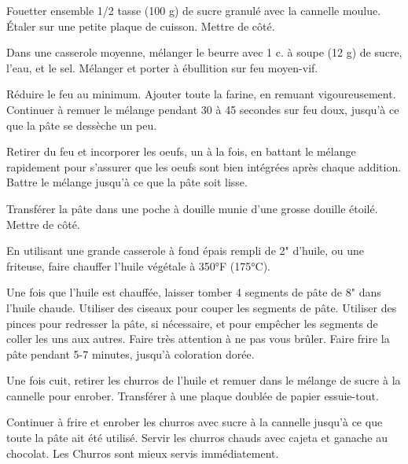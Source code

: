 \begin{steps}
    \item[] 
    \item Fouetter ensemble 1/2 tasse (100 g) de sucre granulé avec la cannelle moulue. Étaler sur une petite plaque de cuisson. Mettre de côté.
    \item Dans une casserole moyenne, mélanger le beurre avec 1 c. à soupe (12 g) de sucre, l'eau, et le sel. Mélanger et porter à ébullition sur feu moyen-vif.
    \item Réduire le feu au minimum. Ajouter toute la farine, en remuant vigoureusement. Continuer à remuer le mélange pendant 30 à 45 secondes sur feu doux, jusqu'à ce que la pâte se dessèche un peu.
    \item Retirer du feu et incorporer les oeufs, un à la fois, en battant le mélange rapidement pour s'assurer que les oeufs sont bien intégrées après chaque addition. Battre le mélange jusqu'à ce que la pâte soit lisse.
    \item Transférer la pâte dans une poche à douille munie d'une grosse douille étoilé. Mettre de côté.
    \item En utilisant une grande casserole à fond épais rempli de 2" d'huile, ou une friteuse, faire chauffer l'huile végétale à 350°F (175°C).
    \item Une fois que l'huile est chauffée, laisser tomber 4 segments de pâte de 8" dans l'huile chaude. Utiliser des ciseaux pour couper les segments de pâte. Utiliser des pinces pour redresser la pâte, si nécessaire, et pour empêcher les segments de coller les uns aux autres. Faire très attention à ne pas vous brûler. Faire frire la pâte pendant 5-7 minutes, jusqu'à coloration dorée.
    \item Une fois cuit, retirer les churros de l'huile et remuer dans le mélange de sucre à la cannelle pour enrober. Transférer à une plaque doublée de papier essuie-tout.
    \item Continuer à frire et enrober les churros avec sucre à la cannelle jusqu'à ce que toute la pâte ait été utilisé. Servir les churros chauds avec cajeta et ganache au chocolat. Les Churros sont mieux servis immédiatement.


\end{steps}
